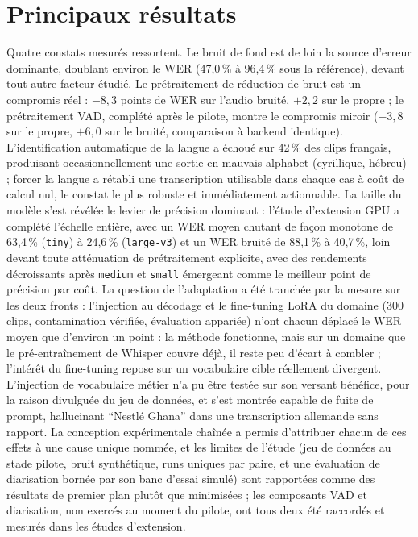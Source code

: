 \documentclass[12pt]{report}
\begin{document}
\section*{Principaux résultats}
Quatre constats mesurés ressortent. Le bruit de fond est de loin la source d'erreur dominante, doublant environ le WER (47,0\,\% à 96,4\,\% sous la référence), devant tout autre facteur étudié. Le prétraitement de réduction de bruit est un compromis réel : $-8{,}3$ points de WER sur l'audio bruité, $+2{,}2$ sur le propre ; le prétraitement VAD, complété après le pilote, montre le compromis miroir ($-3{,}8$ sur le propre, $+6{,}0$ sur le bruité, comparaison à backend identique). L'identification automatique de la langue a échoué sur 42\,\% des clips français, produisant occasionnellement une sortie en mauvais alphabet (cyrillique, hébreu) ; forcer la langue a rétabli une transcription utilisable dans chaque cas à coût de calcul nul, le constat le plus robuste et immédiatement actionnable. La taille du modèle s'est révélée le levier de précision dominant : l'étude d'extension GPU a complété l'échelle entière, avec un WER moyen chutant de façon monotone de 63,4\,\% (\texttt{tiny}) à 24,6\,\% (\texttt{large-v3}) et un WER bruité de 88,1\,\% à 40,7\,\%, loin devant toute atténuation de prétraitement explicite, avec des rendements décroissants après \texttt{medium} et \texttt{small} émergeant comme le meilleur point de précision par coût. La question de l'adaptation a été tranchée par la mesure sur les deux fronts : l'injection au décodage et le fine-tuning LoRA du domaine (300 clips, contamination vérifiée, évaluation appariée) n'ont chacun déplacé le WER moyen que d'environ un point : la méthode fonctionne, mais sur un domaine que le pré-entraînement de Whisper couvre déjà, il reste peu d'écart à combler ; l'intérêt du fine-tuning repose sur un vocabulaire cible réellement divergent. L'injection de vocabulaire métier n'a pu être testée sur son versant bénéfice, pour la raison divulguée du jeu de données, et s'est montrée capable de fuite de prompt, hallucinant \enquote{Nestl\'e Ghana} dans une transcription allemande sans rapport. La conception expérimentale chaînée a permis d'attribuer chacun de ces effets à une cause unique nommée, et les limites de l'étude (jeu de données au stade pilote, bruit synthétique, runs uniques par paire, et une évaluation de diarisation bornée par son banc d'essai simulé) sont rapportées comme des résultats de premier plan plutôt que minimisées ; les composants VAD et diarisation, non exercés au moment du pilote, ont tous deux été raccordés et mesurés dans les études d'extension.
\end{document}
